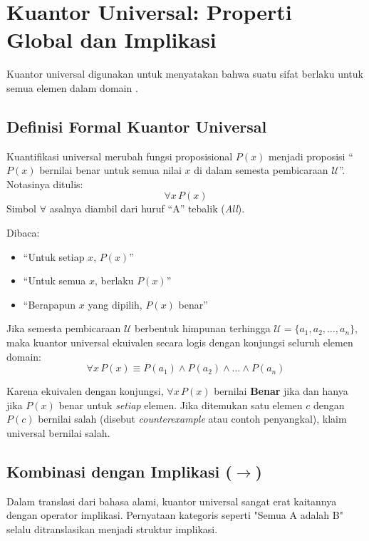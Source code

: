 \section{Kuantor Universal: Properti Global dan Implikasi}

Kuantor universal digunakan untuk menyatakan bahwa suatu sifat berlaku untuk semua elemen dalam domain \cite{rosen2019}.

\subsection{Definisi Formal Kuantor Universal}

\begin{definisi}
Kuantifikasi universal merubah fungsi proposisional $P(x)$ menjadi proposisi ``$P(x)$ bernilai benar untuk semua nilai $x$ di dalam semesta pembicaraan $\mathcal{U}$''. Notasinya ditulis:
\[ \forall x \, P(x) \]
Simbol $\forall$ asalnya diambil dari huruf ``A'' tebalik (\textit{All}).
\end{definisi}

Dibaca:
\begin{itemize}
    \item ``Untuk setiap $x$, $P(x)$''
    \item ``Untuk semua $x$, berlaku $P(x)$''
    \item ``Berapapun $x$ yang dipilih, $P(x)$ benar''
\end{itemize}

Jika semesta pembicaraan $\mathcal{U}$ berbentuk himpunan terhingga $\mathcal{U} = \{a_1, a_2, \ldots, a_n\}$, maka kuantor universal ekuivalen secara logis dengan konjungsi seluruh elemen domain:
\[ \forall x \, P(x) \equiv P(a_1) \land P(a_2) \land \ldots \land P(a_n) \]

Karena ekuivalen dengan konjungsi, $\forall x \, P(x)$ bernilai \textbf{Benar} jika dan hanya jika $P(x)$ benar untuk \emph{setiap} elemen. Jika ditemukan satu elemen $c$ dengan $P(c)$ bernilai salah (disebut \textit{counterexample} atau contoh penyangkal), klaim universal bernilai salah.

\subsection{Kombinasi dengan Implikasi ($\rightarrow$)}

Dalam translasi dari bahasa alami, kuantor universal sangat erat kaitannya dengan operator implikasi. Pernyataan kategoris seperti "Semua A adalah B" selalu ditranslasikan menjadi struktur implikasi.

